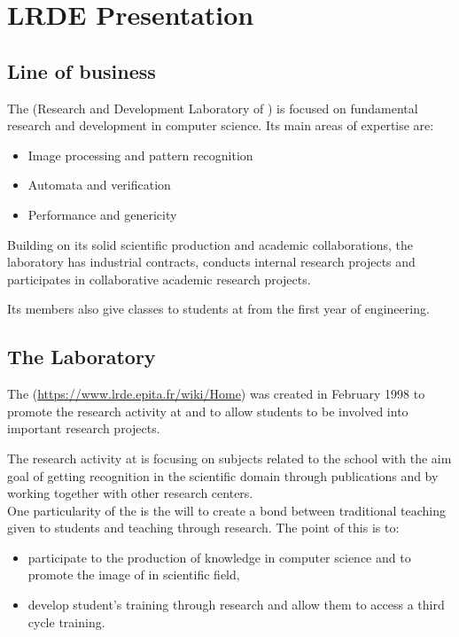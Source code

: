 \chapter{LRDE Presentation}


\section{Line of business}
The \LRDE\space (Research and Development Laboratory of \EPITA) is focused on fundamental
research and development in computer science. Its main areas of expertise are:
\begin{itemize}
 \item Image processing and pattern recognition
 \item Automata and verification
 \item Performance and genericity
\end{itemize}


\noindent Building on its solid scientific production and academic collaborations, the laboratory has
industrial contracts, conducts internal research projects and participates in collaborative
academic research projects.

\noindent Its members also give classes to students at \EPITA\space from the first year of engineering.

\section{The Laboratory}
The \LRDE\space (\url{https://www.lrde.epita.fr/wiki/Home}) was created in February 1998 to promote
the research activity at \EPITA\space and to allow students to be involved into important research
projects.

The research activity at \LRDE\space is focusing on subjects related to the school with the aim goal
of getting recognition in the scientific domain through publications and by working together with other
research centers.\\
One particularity of the \LRDE\space is the will to create a bond between traditional
teaching given to \EPITA\space students and teaching through research. The point of this is to:
\begin{itemize}
  \item participate to the production of knowledge in computer science and to
	promote the image of \EPITA\space in scientific field,
  \item develop \LRDE\space student's training through research and allow them to access a third cycle training.
\end{itemize}


